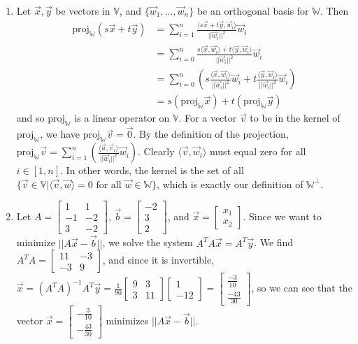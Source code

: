 \documentclass[10pt,english]{article}
\begin{document}
\begin{enumerate}
\pagebreak
\item Let $\vec{x},\vec{y}$ be vectors in $\mathbb{V}$, and $\{\vec{w}_1,\ldots,\vec{w}_n\}$ be an orthogonal basis for $\mathbb{W}$. Then \begin{align*}\text{proj}_\mathbb{W}(s\vec{x}+t\vec{y})&=\sum_{i=1}^n\frac{\langle s\vec{x}+t\vec{y},\vec{w}_i\rangle}{||\vec{w}_i||^2}\vec{w}_i\\&=\sum_{i=0}^n\frac{s\langle\vec{x},\vec{w}_i\rangle+t\langle\vec{y},\vec{w}_i\rangle}{||\vec{w}_i||^2}\vec{w}_i\\&=\sum_{i=0}^n\left(s\frac{\langle\vec{x},\vec{w}_i\rangle}{||\vec{w}_i||^2}\vec{w}_i+t\frac{\langle\vec{y},\vec{w}_i\rangle}{||\vec{w}_i||^2}\vec{w}_i\right)\\&=s(\text{proj}_\mathbb{W}\vec{x})+t(\text{proj}_\mathbb{W}\vec{y})\end{align*} and so $\text{proj}_\mathbb{W}$ is a linear operator on $\mathbb{V}$. For a vector $\vec{v}$ to be in the kernel of $\text{proj}_\mathbb{W}$, we have  $\text{proj}_\mathbb{W}\vec{v}=\vec{0}$. By the definition of the projection, $\text{proj}_\mathbb{W}\vec{v}=\sum_{i=1}^n\left(\frac{\langle\vec{a},\vec{v}_i\rangle}{||\vec{w}_i||^2}\vec{w}_i\right)$. Clearly $\langle\vec{v},\vec{w}_i\rangle$ must equal zero for all $i\in[1,n]$. In other words, the kernel is the set of all $\{\vec{v}\in\mathbb{V}|\langle\vec{v},\vec{w}\rangle=0\text{ for all }\vec{w}\in\mathbb{W}\}$, which is exactly our definition of $\mathbb{W}^\perp$.

\pagebreak
\item Let $A=\begin{bmatrix}1&1\\-1&-2\\3&-2\end{bmatrix}$, $\vec{b}=\begin{bmatrix}-2\\3\\2\end{bmatrix}$, and $\vec{x}=\begin{bmatrix}x_1\\x_2\end{bmatrix}$. Since we want to minimize $||A\vec{x}-\vec{b}||$, we solve the system $A^TA\vec{x}=A^T\vec{y}$. We find $A^TA=\begin{bmatrix}11&-3\\-3&9\end{bmatrix}$, and since it is invertible, $\vec{x}=(A^TA)^{-1}A^T\vec{y}=\frac{1}{90}\begin{bmatrix}9&3\\3&11\end{bmatrix}\begin{bmatrix}1\\-12\end{bmatrix}=\begin{bmatrix}\frac{-3}{10}\\\frac{-43}{30}\end{bmatrix}$, so we can see that the vector $\vec{x}=\begin{bmatrix}-\frac{3}{10}\\-\frac{43}{30}\end{bmatrix}$ minimizes $||A\vec{x}-\vec{b}||$. 


\end{enumerate}
\end{document}
